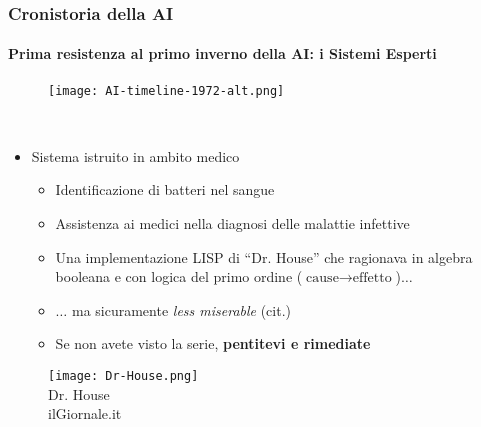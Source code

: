 %
\begin{frame}[t] \frametitle{Cronistoria della AI}
{\scriptsize
{}
\framesubtitle{Prima resistenza al primo inverno della AI: i Sistemi Esperti}
\vspace*{-.5cm}
	\begin{minipage}[t]{\textwidth}
		\begin{figure}[ht]
			\centering
			\texttt{[image: AI-timeline-1972-alt.png]}
		\end{figure}
	\end{minipage}
	\\\vspace*{.3cm}
	\begin{minipage}[t]{\textwidth}
		\begin{minipage}[t]{0.6\textwidth}
			\begin{itemize}[leftmargin=10pt,align=right]
				\onslide<2->\item[\alert{\faHandORight}] Sistema istruito in ambito \alert{medico}
				\begin{itemize}[leftmargin=10pt,align=right]
					\onslide<3->\item[\alert{\faHandORight}] Identificazione di batteri nel sangue
					\item[\alert{\faHandORight}] Assistenza ai medici nella diagnosi delle malattie infettive
					\item[\alert{\faHandORight}] Una implementazione LISP di ``Dr. House'' che ragionava in algebra booleana e con logica del primo ordine ($\textrm{cause} \rightarrow \textrm{effetto}$)$\ldots$
					\onslide<4->\item[\alert{\faHandORight}] $\ldots$ ma sicuramente \emph{less miserable} (cit.)
					\onslide<4->\item[\alert{\faHandORight}] Se non avete visto la serie, \textbf{\alert{pentitevi} e \alert{rimediate}}
				\end{itemize}
			\end{itemize}
		\end{minipage}
		\begin{minipage}[t]{0.4\textwidth}
			\centering
			\begin{figure}[ht]
				\texttt{[image: Dr-House.png]}
				\\Dr. House\\\textsuperscript{\textcopyright}ilGiornale.it
			\end{figure}
		\end{minipage}
	\end{minipage}
}
\end{frame}
